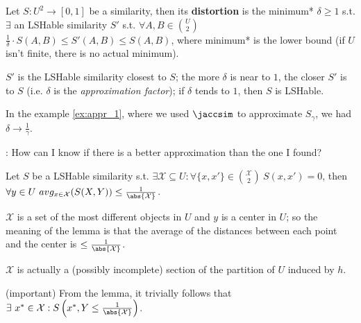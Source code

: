 
 Let $S: U^2 \to [0,1]$ be a similarity, then its \textbf{distortion} is the minimum* $\delta \geq 1$ s.t. $\exists$ an LSHable similarity $S'$ s.t. $\forall {A, B} \in \binom{U}{2}$ $\frac{1}{\delta} \cdot S(A, B) \leq S'(A, B) \leq S(A, B)$, where minimum* is the lower bound (if $U$ isn't finite, there is no actual minimum).

\obs $S'$ is the LSHable similarity closest to $S$; the more $\delta$ is near to $1$, the closer $S'$ is to $S$ (i.e. $\delta$ is the \textit{approximation factor}); if $\delta$ tends to $1$, then $S$ is LSHable.

\ex \label{ex:appr_2} In the example \ref{ex:appr_1}, where we used $\jaccsim$ to approximate $S_\gamma$, we had $\delta \to \frac{1}{\gamma}$.

\qst: How can I know if there is a better approximation than the one I found?

 \label{l:center} Let $S$ be a LSHable similarity s.t. $\exists \mathcal{X} \subseteq U : \forall \{x, x'\} \in \binom{\mathcal{X}}{2} \ S(x, x')=0$, then $\forall y \in U \ avg_{x \in \mathcal{X}}(S(X, Y)) \leq \frac{1}{\abs{\mathcal{X}}}$.

\obs $\mathcal{X}$ is a set of the most different objects in $U$ and $y$ is a center in $U$; so the meaning of the lemma is that the average of the distances between each point and the center is $\leq \frac{1}{\abs{\mathcal{X}}}$.

\obs $\mathcal{X}$ is actually a (possibly incomplete) section of the partition of $U$ induced by $h$.

\obs (important) From the lemma, it trivially follows that $\exists \ x^* \in \mathcal{X} : S\left(x^*, Y \leq \frac{1}{\abs{\mathcal{X}}}\right)$.

